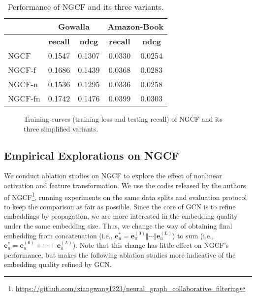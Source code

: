 \documentclass[sigconf]{acmart}
\newcommand{\Mat}[1]{\mathbf{#1}}
\theoremstyle{definition}
\begin{document}
\begin{table}[t]
\caption{Performance of NGCF and its three variants.}
\vspace{-10px}
\label{tab:pre}
\begin{tabular}{l|c c|c c}
\hline
 & \multicolumn{2}{c|}{\textbf{Gowalla}} & \multicolumn{2}{c}{\textbf{Amazon-Book}} \\ \hline
 & \textbf{recall} & \textbf{ndcg} &  \textbf{recall} & \textbf{ndcg} \\ \hline\hline
NGCF &  0.1547 & 0.1307 & 0.0330 & 0.0254 \\ \hline 
NGCF-f    & 0.1686 & 0.1439 & 0.0368 & 0.0283 \\ 
NGCF-n & 0.1536 & 0.1295 & 0.0336 & 0.0258 \\  
NGCF-fn   & 0.1742 & 0.1476 & 0.0399 & 0.0303 \\ \hline
\end{tabular}\end{table}


\begin{figure*}[t]
	\centering
	\vspace{-15pt}
	\caption{Training curves (training loss and testing recall) of NGCF and its three simplified variants.} \vspace{-10pt}
	\label{fig:train-epochs}
\end{figure*}

\subsection{Empirical Explorations on NGCF} \label{ss:ngcf_study}
We conduct ablation studies on NGCF to explore the effect of nonlinear activation and feature transformation. We use the codes released by the authors of NGCF\footnote{\url{https://github.com/xiangwang1223/neural_graph_collaborative_filtering}}, running experiments on the same data splits and evaluation protocol to keep the comparison as fair as possible. 
Since the core of GCN is to refine embeddings by propagation, we are more interested in the embedding quality under the same embedding size. Thus, we change the way of obtaining final embedding from concatenation (i.e., $\Mat{e}^{*}_{u}= \Mat{e}^{(0)}_{u}\Vert\cdots\Vert\Mat{e}^{(L)}_{u}$) to sum (i.e., $\Mat{e}^{*}_{u}= \Mat{e}^{(0)}_{u} + \cdots + \Mat{e}^{(L)}_{u}$).
Note that this change has little effect on NGCF's performance, but makes the following ablation studies more indicative of the embedding quality refined by GCN. 
\end{document}
